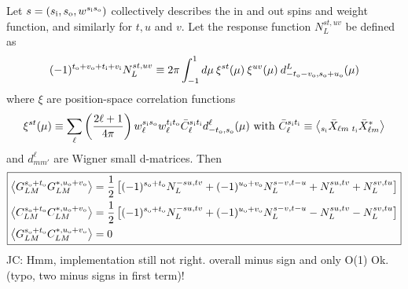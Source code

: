 \documentclass{article}
\newcommand{\si}[0]{{s_{\rm i}}}
\newcommand{\ti}[0]{{t_{\rm i}}}
\newcommand{\vi}[0]{{v_{\rm i}}}
\newcommand{\so}[0]{{s_{\rm o}}}
\renewcommand{\to}[0]{{t_{\rm o}}}
\newcommand{\uo}[0]{{u_{\rm o}}}
\newcommand{\vo}[0]{{v_{\rm o}}}
\newcommand{\av}[1]{\left\langle #1 \right\rangle}
\newcommand{\JC}[1]{\color{red}JC: #1\color{black}}
\begin{document}
Let $s = (\si, \so, w^{\si\so})$ collectively describes the in and out spins and weight function, and similarly for $t, u$ and $v$. Let the response function $N^{st, uv}_L$ be defined as
\begin{equation}
(-1)^{\to + \vo + \ti + \vi} N_L^{st,uv} \equiv 2\pi  \int_{-1}^1 d \mu \:\xi^{st}(\mu)\:\xi^{uv}(\mu)\: d^L_{-\to - \vo, \so + \uo}(\mu) 
\end{equation}
where $\xi$ are position-space correlation functions
\begin{equation}
\xi^{st}(\mu) \equiv  \sum_\ell \left(\frac{2\ell + 1}{4\pi}\right)w^{\si\so}_\ell w^{\ti\to}_\ell \bar C_\ell^{\si \ti} d^\ell_{-\to,\so}(\mu)\textrm{ with } \bar C_\ell^{\si \ti} \equiv \av{ _{\si}\bar X_{\ell m}\: _{\ti} \bar X^*_{\ell m} }
\end{equation}
and $d^\ell_{mm'}$ are Wigner small d-matrices.
Then
\begin{equation} \boxed{
\begin{split}
\av{G^{\so + \to}_{LM} G^{*, \uo + \vo}_{L M} } &= \frac 12\left[ (-1)^{\so + \to} N^{-su, tv}_L + (-1)^{\uo + \vo} N_L^{s-v, t-u}+N^{su, tv}_L  + N^{sv, tu}_L \right] \\
		\av{C^{\so + \to}_{LM} C^{*, \uo + \vo}_{L M} } &= \frac 12\left[ (-1)^{\so + \to} N^{-su, tv}_L + (-1)^{\uo + \vo} N_L^{s-v, t-u}-N^{su, tv}_L  - N^{sv, tu}_L \right] \\
	\av{G^{\so + \to}_{LM} C^{*, \uo + \vo}_{L M} } &=0
\end{split}}
\end{equation}
\JC{Hmm, implementation still not right. overall minus sign and only O(1) Ok. (typo, two minus signs in first term)!}
\end{document}

